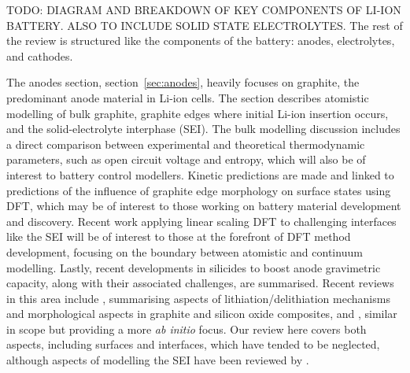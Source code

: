 \documentclass[../main.tex]{subfiles}
\begin{document}
TODO: DIAGRAM AND BREAKDOWN OF KEY COMPONENTS OF LI-ION BATTERY. ALSO TO INCLUDE SOLID STATE ELECTROLYTES. The rest of the review is structured like the components of the battery: anodes, electrolytes, and cathodes.

The anodes section, section~\ref{sec:anodes}, heavily focuses on graphite, the predominant anode material in Li-ion cells. The section describes atomistic modelling of bulk graphite, graphite edges where initial Li-ion insertion occurs, and the solid-electrolyte interphase (SEI). The bulk modelling discussion includes a direct comparison between experimental and theoretical thermodynamic parameters, such as  open circuit voltage and entropy, which will also be of interest to battery control modellers. Kinetic predictions are made and linked to predictions of the influence of graphite edge morphology on surface states using DFT, which may be of interest to those working on battery material development and discovery. Recent work applying linear scaling DFT to challenging interfaces like the SEI will be of interest to those at the forefront of DFT method development, focusing on the boundary between atomistic and continuum modelling. Lastly, recent developments in silicides to boost anode gravimetric capacity, along with their associated challenges, are summarised. Recent reviews in this area include \citeauthor{asenbauer_success_2020} \cite{asenbauer_success_2020}, summarising aspects of lithiation/delithiation mechanisms and morphological aspects in graphite and silicon oxide composites, and \citeauthor{ZHANG2021147} \cite{ZHANG2021147}, similar in scope but providing a more \textit{ab initio} focus. Our review here covers both aspects, including surfaces and interfaces, which have tended to be neglected, although aspects of modelling the SEI have been reviewed by \citeauthor{Wang2018} \cite{Wang2018}.
\end{document}
